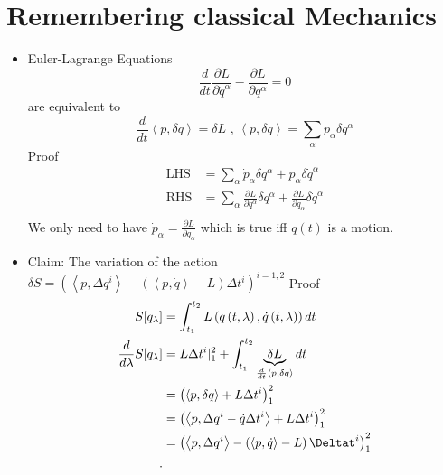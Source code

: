 \documentclass{report}
\begin{document}
\section{Remembering classical Mechanics}
\begin{itemize}
  \item Euler-Lagrange Equations \[
      \frac{d}{dt} \frac{\partial L }{\partial \dot{q}^\alpha} - \frac{\partial L}{\partial q^\alpha} = 0
  \] are equivalent to \[
  \frac{d}{dt} \left<p, \delta q\right> = \delta L \text{  ,  } \left<p, \delta q\right> = \sum_{\alpha}^{} p_\alpha \delta q^\alpha
  \] Proof
  \begin{align*}
    \text{LHS} &= \sum_{\alpha}^{} \dot{p}_\alpha \delta q^\alpha + p_\alpha \delta \dot{q}^\alpha \\
    \text{RHS} &= \sum_{\alpha}^{} \frac{\partial L}{\partial q^\alpha} \delta q^\alpha + \frac{\partial L}{\partial \dot{q}_\alpha} \delta \dot{q}^\alpha \\
  \end{align*} We only need to have $\dot{p}_\alpha = \frac{\partial L}{\partial q_\alpha}$ which is true iff $q(t)$ is a motion.
\item Claim: The variation of the action $\delta S = \left( \left<p, \Delta q^i\right> - \left( \left<p, \dot{q}\right> - L \right) \Delta t^i \right)^{i = 1,2}$ 
  Proof 
  \begin{align*}
    S[q_\lambda] &=\int_{t_1}^{t_2} L\left( q\left( t,\lambda \right) , \dot{q}\left( t, \lambda \right)  \right) dt \\
    \frac{d}{d\lambda} S[q_\lambda] &= L \Delta t^i|_1^2 + \int_{t_1}^{t_2} \underbrace{\delta L}_{\frac{d}{dt} \left<p, \delta q\right>} dt \\
                                    &= \left( \left<p, \delta q\right> + L \Delta t^i \right)_{1}^2 \\  
                                    &= \left( \left<p, \Delta q^i - \dot{q} \Delta t^i\right> + L \Delta t^i \right)_{1}^2 \\  
                                    &= \left( \left<p, \Delta q^i\right> - \left( \left<p, \dot{q}\right> - L \right) \Deltat^i \right) _1^2 \\
  .\end{align*}
\end{itemize}
\end{document}

